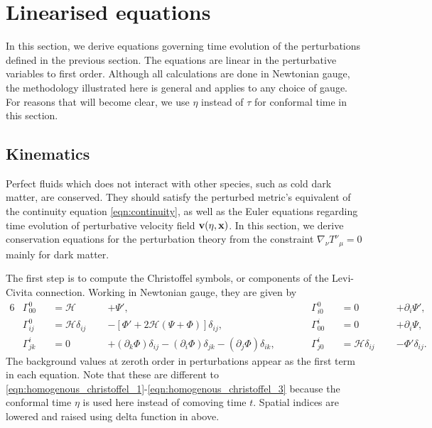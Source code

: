 \section{Linearised equations}

In this section, we derive equations governing time evolution of the perturbations defined in the previous section. The equations are linear in the perturbative variables to first order. Although all calculations are done in Newtonian gauge, the methodology illustrated here is general and applies to any choice of gauge. For reasons that will become clear, we use $\eta$ instead of $\tau$ for conformal time in this section.

\subsection{Kinematics}

Perfect fluids which does not interact with other species, such as cold dark matter, are conserved. They should satisfy the perturbed metric's equivalent of the continuity equation \eqref{eqn:continuity}, as well as the Euler equations regarding time evolution of perturbative velocity field $\mathbf{v}(\eta,\mathbf{x})$. In this section, we derive conservation equations for the perturbation theory from the constraint $\nabla_\nu {T^\nu}_\mu = 0$ mainly for dark matter.

The first step is to compute the Christoffel symbols, or components of the Levi-Civita connection. Working in Newtonian gauge, they are given by
\begin{alignat}{6}
	&\Gamma^{0}_{00} &&= \mathcal{H} \;\;&&+ \Psi', \qquad &&\Gamma^{0}_{i0} &&= 0 \;\;&&+ \partial_i\Psi', \label{eqn:perturbed_christoffel_symbols_1}\\
	&\Gamma^{0}_{ij} &&= \mathcal{H}\delta_{ij} \;\;&&- \left[\Phi' + 2\mathcal{H}(\Psi+\Phi) \right]\delta_{ij}, \qquad &&\Gamma^{i}_{00} &&= 0 \;\;&&+ \partial_i\Psi, \label{eqn:perturbed_christoffel_symbols_2}\\
	&\Gamma^{i}_{jk} &&= 0 \;\;&&+ (\partial_k \Phi)\delta_{ij} - (\partial_i \Phi)\delta_{jk} - (\partial_j \Phi)\delta_{ik}, \qquad &&\Gamma^{i}_{j0} &&= \mathcal{H}\delta_{ij} \;\;&&- \Phi'\delta_{ij}. \label{eqn:perturbed_christoffel_symbols_3}
\end{alignat}
The background values at zeroth order in perturbations appear as the first term in each equation. Note that these are different to \eqref{eqn:homogenous_christoffel_1}-\eqref{eqn:homogenous_christoffel_3} because the conformal time $\eta$ is used here instead of comoving time $t$. Spatial indices are lowered and raised using delta function in above.

